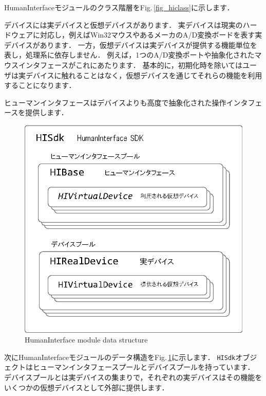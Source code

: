 HumanInterface\KLUDGE モジュールのクラス階層をFig.\,\ref{fig_hiclass}\KLUDGE に示します．

\KLUDGE デバイスには実デバイスと仮想デバイスがあります．
\KLUDGE 実デバイスは現実のハードウェアに対応し，例えばWin32\KLUDGE マウスやあるメーカのA/D\KLUDGE 変換ボードを表す実デバイスがあります．
\KLUDGE 一方，仮想デバイスは実デバイスが提供する機能単位を表し，処理系に依存しません．
\KLUDGE 例えば，1\KLUDGE つのA/D\KLUDGE 変換ポートや抽象化されたマウスインタフェースがこれにあたります．
\KLUDGE 基本的に，初期化時を除いてはユーザは実デバイスに触れることはなく，仮想デバイスを通じてそれらの機能を利用することになります．

\KLUDGE ヒューマンインタフェースはデバイスよりも高度で抽象化された操作インタフェースを提供します．


\begin{figure}[t]
\begin{center}
\includegraphics[width=.5\hsize]{fig/humaninterface.eps}
\end{center}
\caption{HumanInterface module data structure}
\label{fig_humaninterface}
\end{figure}

\KLUDGE 次にHumanInterface\KLUDGE モジュールのデータ構造をFig.\,\ref{fig_humaninterface}\KLUDGE に示します．
\texttt{HISdk}\KLUDGE オブジェクトはヒューマンインタフェースプールとデバイスプールを持っています．
\KLUDGE デバイスプールとは実デバイスの集まりで，それぞれの実デバイスはその機能をいくつかの仮想デバイスとして外部に提供します．

